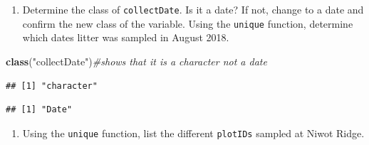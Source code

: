 \documentclass[
]{article}
\newenvironment{Shaded}{\begin{snugshade}}{\end{snugshade}}
\newcommand{\AttributeTok}[1]{\textcolor[rgb]{0.13,0.29,0.53}{#1}}
\newcommand{\CommentTok}[1]{\textcolor[rgb]{0.56,0.35,0.01}{\textit{#1}}}
\newcommand{\FunctionTok}[1]{\textcolor[rgb]{0.13,0.29,0.53}{\textbf{#1}}}
\newcommand{\NormalTok}[1]{#1}
\newcommand{\OtherTok}[1]{\textcolor[rgb]{0.56,0.35,0.01}{#1}}
\newcommand{\SpecialCharTok}[1]{\textcolor[rgb]{0.81,0.36,0.00}{\textbf{#1}}}
\newcommand{\StringTok}[1]{\textcolor[rgb]{0.31,0.60,0.02}{#1}}
\providecommand{\tightlist}{%
  \setlength{\itemsep}{0pt}\setlength{\parskip}{0pt}}
\begin{document}
\begin{enumerate}
\def\labelenumi{\arabic{enumi}.}
\setcounter{enumi}{11}
\tightlist
\item
  Determine the class of \texttt{collectDate}. Is it a date? If not,
  change to a date and confirm the new class of the variable. Using the
  \texttt{unique} function, determine which dates litter was sampled in
  August 2018.
\end{enumerate}

\begin{Shaded}
\begin{Highlighting}[]
\FunctionTok{class}\NormalTok{(}\StringTok{"collectDate"}\NormalTok{)}\CommentTok{\#shows that it is a character not a date }
\end{Highlighting}
\end{Shaded}

\begin{verbatim}
## [1] "character"
\end{verbatim}

\begin{Shaded}
\end{Shaded}

\begin{verbatim}
## [1] "Date"
\end{verbatim}

\begin{enumerate}
\def\labelenumi{\arabic{enumi}.}
\setcounter{enumi}{12}
\tightlist
\item
  Using the \texttt{unique} function, list the different
  \texttt{plotIDs} sampled at Niwot Ridge.
\end{enumerate}

\begin{Shaded}
\end{Shaded}
\end{document}
